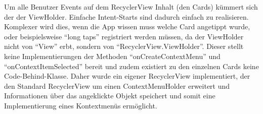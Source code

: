 Um alle Benutzer Events auf dem RecyclerView Inhalt (den Cards) kümmert sich der der ViewHolder. Einfache Intent-Starts sind dadurch einfach zu realisieren. Komplexer wird dies, wenn die App wissen muss welche Card angetippt wurde, oder beispielsweise \enquote{long taps} registriert werden müssen, da der ViewHolder nicht von \enquote{View} erbt, sondern von \enquote{RecyclerView.ViewHolder}. Dieser stellt keine Implementierungen der Methoden \enquote{onCreateContextMenu} und \enquote{onContextItemSelected} bereit und zudem existiert zu den einzelnen Cards keine Code-Behind-Klasse. Daher wurde ein eigener RecyclerView implementiert, der den Standard RecyclerView um einen ContextMenuHolder erweitert und Informationen über das angeklickte Objekt speichert und somit eine Implementierung eines Kontextmenüs ermöglicht.
